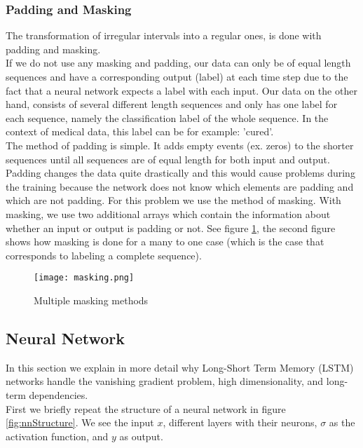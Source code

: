 \subsubsection{Padding and Masking}
The transformation of irregular intervals into a regular ones, is done with padding and masking. \\

If we do not use any masking and padding, our data can only be of equal length sequences and have a corresponding output (label) at each time step due to the fact that a neural network expects a label with each input. Our data on the other hand, consists of several different length sequences and only has one label for each sequence, namely the classification label of the whole sequence. In the context of medical data, this label can be for example: 'cured'. \\

The method of padding is simple. It adds empty events (ex. zeros) to the shorter sequences until all sequences are of equal length for both input and output. \\
Padding changes the data quite drastically and this would cause problems during the training because the network does not know which elements are padding and which are not padding. For this problem we use the method of masking. With masking, we use two additional arrays which contain the information about whether an input or output is padding or not. See figure \ref{fig:masking}, the second figure shows how masking is done for a many to one case (which is the case that corresponds to labeling a complete sequence). \\

\begin{figure}[!htb]
	\centering
	\texttt{[image: masking.png]}
	\caption{Multiple masking methods \cite{dl4jRnn:online}}
	\label{fig:masking}
\end{figure} 


\subsection{Neural Network}
\label{sec:nn}

In this section we explain in more detail why Long-Short Term Memory (LSTM) \cite{lstmOrginin:article} networks handle the vanishing gradient problem, high dimensionality, and long-term dependencies. \\

First we briefly repeat the structure of a neural network in figure \ref{fig:nnStructure}. We see the input $x$, different layers with their neurons, $\sigma$ as the activation function, and $y$ as output. \\

